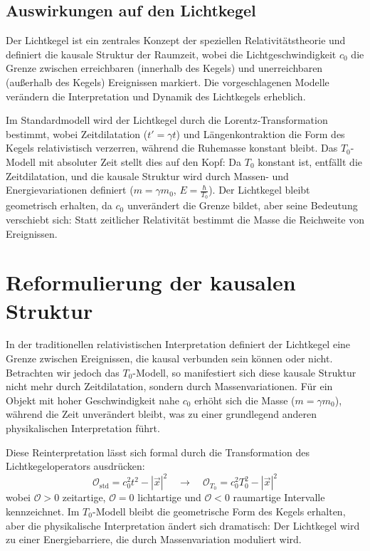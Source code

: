 \documentclass[a4paper,12pt]{article}
\begin{document}
\subsection{Auswirkungen auf den Lichtkegel}
Der Lichtkegel ist ein zentrales Konzept der speziellen Relativitätstheorie und definiert die kausale Struktur der Raumzeit, wobei die Lichtgeschwindigkeit \( c_0 \) die Grenze zwischen erreichbaren (innerhalb des Kegels) und unerreichbaren (außerhalb des Kegels) Ereignissen markiert. Die vorgeschlagenen Modelle verändern die Interpretation und Dynamik des Lichtkegels erheblich.

Im Standardmodell wird der Lichtkegel durch die Lorentz-Transformation bestimmt, wobei Zeitdilatation (\( t' = \gamma t \)) und Längenkontraktion die Form des Kegels relativistisch verzerren, während die Ruhemasse konstant bleibt. Das \( T_0 \)-Modell mit absoluter Zeit stellt dies auf den Kopf: Da \( T_0 \) konstant ist, entfällt die Zeitdilatation, und die kausale Struktur wird durch Massen- und Energievariationen definiert (\( m = \gamma m_0 \), \( E = \frac{\hbar}{T_0} \)). Der Lichtkegel bleibt geometrisch erhalten, da \( c_0 \) unverändert die Grenze bildet, aber seine Bedeutung verschiebt sich: Statt zeitlicher Relativität bestimmt die Masse die Reichweite von Ereignissen.

\section{Reformulierung der kausalen Struktur}
In der traditionellen relativistischen Interpretation definiert der Lichtkegel eine Grenze zwischen Ereignissen, die kausal verbunden sein können oder nicht. Betrachten wir jedoch das \( T_0 \)-Modell, so manifestiert sich diese kausale Struktur nicht mehr durch Zeitdilatation, sondern durch Massenvariationen. Für ein Objekt mit hoher Geschwindigkeit nahe \( c_0 \) erhöht sich die Masse (\( m = \gamma m_0 \)), während die Zeit unverändert bleibt, was zu einer grundlegend anderen physikalischen Interpretation führt.

Diese Reinterpretation lässt sich formal durch die Transformation des Lichtkegeloperators ausdrücken:
\begin{equation}
	\mathcal{O}_{\text{std}} = c_0^2 t^2 - |\vec{x}|^2 \quad \rightarrow \quad \mathcal{O}_{T_0} = c_0^2 T_0^2 - |\vec{x}|^2
\end{equation}
wobei \( \mathcal{O} > 0 \) zeitartige, \( \mathcal{O} = 0 \) lichtartige und \( \mathcal{O} < 0 \) raumartige Intervalle kennzeichnet. Im \( T_0 \)-Modell bleibt die geometrische Form des Kegels erhalten, aber die physikalische Interpretation ändert sich dramatisch: Der Lichtkegel wird zu einer Energiebarriere, die durch Massenvariation moduliert wird.
\end{document}

